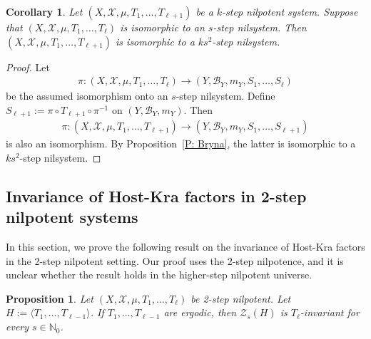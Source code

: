 \documentclass[11pt]{amsart}
\newtheorem{corollary}[lemma]{Corollary}
\newtheorem{proposition}[lemma]{Proposition}
\theoremstyle{definition}
\newcommand{\N}{{\mathbb N}}
\newcommand{\CB}{{\mathcal B}}
\newcommand{\CX}{{\mathcal X}}
\newcommand{\CY}{{\mathcal Y}}
\newcommand{\CZ}{{\mathcal Z}}
\newcommand{\inv}{^{-1}}
\newcommand{\1}{{\mathbf{1}}}
\begin{document}
\begin{corollary}\label{C: Bryna}
Let $(X, \CX, \mu, T_1, \ldots, T_{\ell+1})$ be a $k$-step nilpotent system. Suppose that $(X, \CX, \mu, T_1, \ldots, T_{\ell})$ is isomorphic to an $s$-step nilsystem. Then $(X, \CX, \mu, T_1, \ldots, T_{\ell+1})$ is isomorphic to a $ks^2$-step nilsystem.
\end{corollary}
\begin{proof}
    Let %
\begin{align*}
    \pi: (X, \CX, \mu, T_1, \ldots, T_\ell)\to (Y, \CB_Y, m_{Y}, S_1, \ldots, S_\ell)
\end{align*}
be the assumed isomorphism onto an $s$-step nilsystem. Define $S_{\ell+1}:=\pi\circ T_{\ell+1}\circ \pi\inv$ on $(Y, \CB_Y, m_{Y})$. Then
\begin{align*}
    \pi: (X, \CX, \mu, T_1, \ldots, T_{\ell+1})\to (Y, \CB_Y, m_{Y}, S_1, \ldots, S_{\ell+1})
\end{align*}
is also an isomorphism. By Proposition~\ref{P: Bryna}, the latter is isomorphic to a $ks^2$-step nilsystem.
\end{proof}




\subsection{Invariance of Host-Kra factors in 2-step nilpotent systems}
In this section, we prove the following result on the invariance of Host-Kra factors in the 2-step nilpotent setting. Our proof uses the 2-step nilpotence, and it is unclear whether the result holds in the higher-step nilpotent universe.
\begin{proposition}\label{P: Z_s(T_1) is T_2-invariant}
    Let $(X, \CX, \mu, T_1, \ldots, T_\ell)$ be 2-step nilpotent. Let $H:=\langle T_1, \ldots, T_{\ell-1}\rangle$. If $T_1, \ldots, T_{\ell-1}$ are ergodic, then $\CZ_s(H)$ is $T_\ell$-invariant for  every $s\in\N_0$.
\end{proposition}
\end{document}
